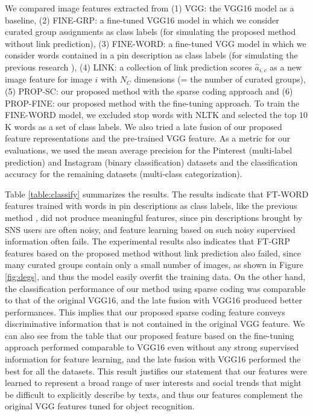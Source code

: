 \documentclass[letterpaper]{article} %
\begin{document}
We compared image features extracted from
(1) VGG: the VGG16 model as a baseline,
(2) FINE-GRP: a fine-tuned VGG16 model in which we consider curated group assignments as class labels (for simulating the proposed method without link prediction),
(3) FINE-WORD: a fine-tuned VGG model in which we consider words contained in a pin description as class labels (for simulating the previous research \cite{Joulin2016}),
(4) LINK: a collection of link prediction scores $\hat{a}_{i,c}$ as a new image feature for image $i$ with $N_C$ dimensions (= the number of curated groups),
(5) PROP-SC: our proposed method with the sparse coding approach and
(6) PROP-FINE: our proposed method with the fine-tuning approach.
To train the FINE-WORD model, we excluded stop words with NLTK and selected the top $10$K words as a set of class labels.
We also tried a late fusion of our proposed feature representations and the pre-trained VGG feature.
As a metric for our evaluations, we used the mean average precision for the Pinterest (multi-label prediction) and Instagram (binary classification) datasets and the classification accuracy for the remaining datasets (multi-class categorization).

Table \ref{table:classify} summarizes the results.
The results indicate that FT-WORD features trained with words in pin descriptions as class labels, like the previous method \cite{Joulin2016}, did not produce meaningful features, since pin descriptions brought by SNS users are often noisy, and feature learning based on such noisy supervised information often fails.
The experimental results also indicates that FT-GRP features based on the proposed method without link prediction also failed, since many curated groups contain only a small number of images, as shown in Figure \ref{fig:degs}, and thus the model easily overfit the training data.
On the other hand, the classification performance of our method using sparse coding was comparable to that of the original VGG16, and the late fusion with VGG16 produced better performances.
This implies that our proposed sparse coding feature conveys discriminative information that is not contained in the original VGG feature.
We can also see from the table that our proposed feature based on the fine-tuning approach performed comparable to VGG16 even without any strong supervised information for feature learning, and the late fusion with VGG16 performed the best for all the datasets.
This result justifies our statement that our features were learned to represent a broad range of user interests and social trends that might be difficult to explicitly describe by texts, and thus our features complement the original VGG features tuned for object recognition.
\end{document}
